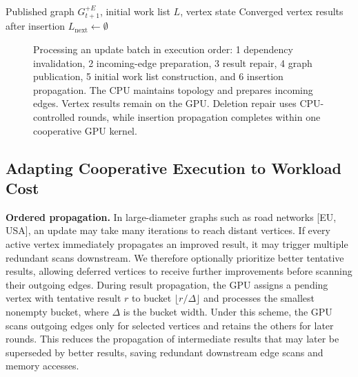 \begin{algorithm}[t]
\caption{Insertion propagation in one cooperative GPU kernel.}
\label{alg:insertion-propagation}
\small
\begin{algorithmic}[1]
\Require Published graph $G_{t+1}^{+E}$, initial work list $L$, vertex state
\Ensure Converged vertex results after insertion
    \State $L_{\mathrm{next}} \gets \emptyset$
                    \State {}
                \EndIf
            \EndFor
        \EndIf
    \EndFor
    \State {} 
    \State {}
\EndWhile
\end{algorithmic}
\end{algorithm}



\begin{figure}[t]
\centering
{}
\caption{Processing an update batch in execution order: 1 dependency invalidation, 2 incoming-edge preparation, 3 result repair, 4 graph publication, 5 initial work list construction, and 6 insertion propagation. The CPU maintains topology and prepares incoming edges. Vertex results remain on the GPU. Deletion repair uses CPU-controlled rounds, while insertion propagation completes within one cooperative GPU kernel.}
\label{fig:3}
\end{figure}



\subsection{Adapting Cooperative Execution to Workload Cost}
\label{sec:workload-cost}

\textbf{Ordered propagation.} In large-diameter graphs such as road networks [EU, USA], an update may take many iterations to reach distant vertices. If every active vertex immediately propagates an improved result, it may trigger multiple redundant scans downstream. We therefore optionally prioritize better tentative results, allowing deferred vertices to receive further improvements before scanning their outgoing edges. During result propagation, the GPU assigns a pending vertex with tentative result $r$ to bucket $\lfloor r/\Delta\rfloor$ and processes the smallest nonempty bucket, where $\Delta$ is the bucket width. Under this scheme, the GPU scans outgoing edges only for selected vertices and retains the others for later rounds. This reduces the propagation of intermediate results that may later be superseded by better results, saving redundant downstream edge scans and memory accesses.

